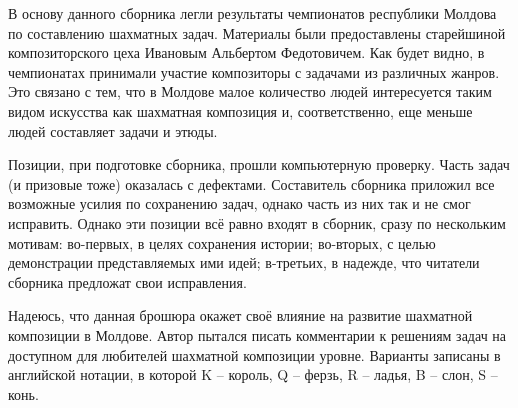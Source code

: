 В основу данного сборника легли результаты чемпионатов республики Молдова по составлению шахматных задач. Материалы были предоставлены старейшиной композиторского цеха Ивановым Альбертом Федотовичем. Как будет видно, в чемпионатах принимали участие композиторы с задачами из различных жанров. Это связано с тем, что в Молдове малое количество людей интересуется таким видом искусства как шахматная композиция и, соответственно, еще меньше людей составляет задачи и этюды.

Позиции, при подготовке сборника, прошли компьютерную проверку. Часть задач (и призовые тоже) оказалась с дефектами. Составитель сборника приложил все возможные усилия по сохранению задач, однако часть из них так и не смог исправить. Однако эти позиции всё равно входят в сборник, сразу по нескольким мотивам: во-первых, в целях сохранения истории; во-вторых, с целью демонстрации представляемых ими идей; в-третьих, в надежде, что читатели сборника предложат свои исправления.

Надеюсь, что данная брошюра окажет своё влияние на развитие шахматной композиции в Молдове. Автор пытался писать комментарии к решениям задач на доступном для любителей шахматной композиции уровне. Варианты записаны в английской нотации, в которой K – король, Q – ферзь, R – ладья, B – слон, S – конь.
